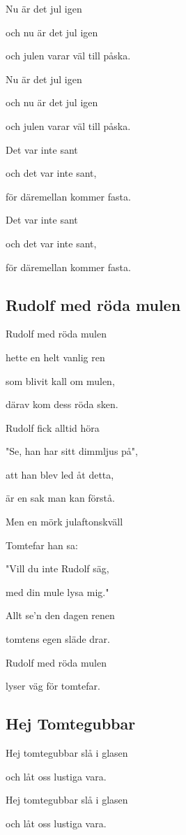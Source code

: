 Nu är det jul igen

och nu är det jul igen

och julen varar väl till påska.

Nu är det jul igen

och nu är det jul igen

och julen varar väl till påska.

Det var inte sant

och det var inte sant,

för däremellan kommer fasta.

Det var inte sant

och det var inte sant,

för däremellan kommer fasta.

\subsection{\textbf{Rudolf med röda mulen}}

Rudolf med röda mulen

hette en helt vanlig ren

som blivit kall om mulen,

därav kom dess röda sken.

Rudolf fick alltid höra

"Se, han har sitt dimmljus på",

att han blev led åt detta,

är en sak man kan förstå. \bigskip

Men en mörk julaftonskväll

Tomtefar han sa:

"Vill du inte Rudolf säg,

med din mule lysa mig."

Allt se'n den dagen renen

tomtens egen släde drar.

Rudolf med röda mulen

lyser väg för tomtefar. 

\subsection{\textbf{Hej Tomtegubbar}}

Hej tomtegubbar slå i glasen

och låt oss lustiga vara.

Hej tomtegubbar slå i glasen

och låt oss lustiga vara.

